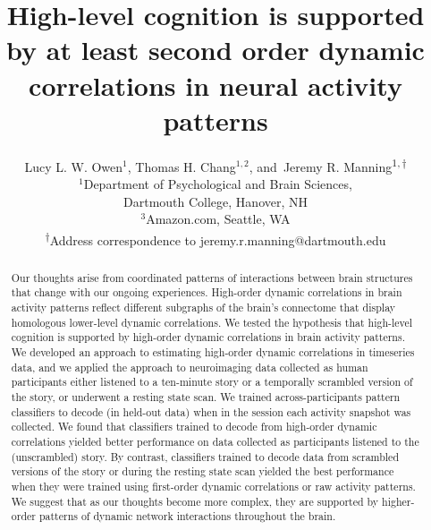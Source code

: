 \documentclass[english]{article}
\title{High-level cognition is supported by at least second order
  dynamic correlations in neural activity patterns}
\author{Lucy L. W. Owen$^1$, Thomas H. Chang$^{1,2}$, and\
  Jeremy R. Manning\textsuperscript{$1, \dagger$}\\
  [0.1in]$^1$Department of Psychological and Brain
  Sciences,\\Dartmouth
  College, Hanover, NH\\
  $^3$Amazon.com, Seattle, WA\\
  \textsuperscript{$\dagger$}Address correspondence to
  jeremy.r.manning@dartmouth.edu}
\begin{document}
\maketitle


\begin{abstract}
  Our thoughts arise from coordinated patterns of interactions between
  brain structures that change with our ongoing experiences.
  High-order dynamic correlations in brain activity patterns reflect
  different subgraphs of the brain's connectome that display
  homologous lower-level dynamic correlations.  We tested the
  hypothesis that high-level cognition is supported by high-order
  dynamic correlations in brain activity patterns.  We developed an
  approach to estimating high-order dynamic correlations in timeseries
  data, and we applied the approach to neuroimaging data collected as
  human participants either listened to a ten-minute story or a
  temporally scrambled version of the story, or underwent a resting
  state scan.  We trained across-participants pattern classifiers to
  decode (in held-out data) when in the session each activity snapshot
  was collected.  We found that classifiers trained to decode from
  high-order dynamic correlations yielded better performance on data
  collected as participants listened to the (unscrambled) story.  By
  contrast, classifiers trained to decode data from scrambled versions
  of the story or during the resting state scan yielded the best
  performance when they were trained using first-order dynamic
  correlations or raw activity patterns.  We suggest that as our
  thoughts become more complex, they are supported by higher-order
  patterns of dynamic network interactions throughout the brain.
\end{abstract}

\doublespacing
\end{document}
